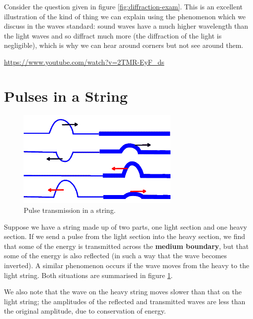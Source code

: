 \documentclass[a4paper]{amsbook}
\newcommand\capcite[1]{}
\begin{document}
Consider the question given in figure \ref{fig:diffraction-exam}. This is an excellent illustration of the kind of thing we can explain using
the phenomenon which we discuss in the waves standard: sound waves have a much higher wavelength than the light waves and so diffract
much more (the diffraction of the light is negligible), which is why we can hear around corners but not see around them.

\begin{center}
\begin{tcolorbox}[width=0.8\textwidth,colback={red},title={\textbf{Go and watch...}},colbacktitle=yellow,coltitle=blue]
  \textcolor{white}{\url{https://www.youtube.com/watch?v=2TMR-EyF_ds}}
\end{tcolorbox}
\end{center}

\section{Pulses in a String}
\begin{figure}
  \centering
  \includegraphics[width=0.7\textwidth]{string}
  \caption{Pulse transmission in a string. \capcite{http://minerva.union.edu/newmanj/physics100/light\%20as\%20a\%20wave/outofphasewaves.gif}\label{fig:string}}
\end{figure}
Suppose we have a string made up of two parts, one light section and one heavy section. If we send a pulse from the light section
into the heavy section, we find that some of the energy is transmitted across the \textbf{medium boundary}, but that some of the
energy is also reflected (in such a way that the wave becomes inverted). A similar phenomenon occurs if the wave moves from the
heavy to the light string. Both situations are summarised in figure \ref{fig:string}.

We also note that the wave on the heavy string moves slower than that on the light string; the amplitudes of the reflected and transmitted
waves are less than the original amplitude, due to conservation of energy.
\end{document}

